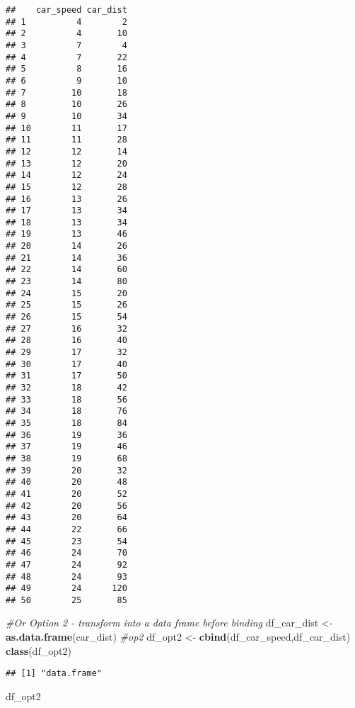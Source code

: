 \documentclass[
]{article}
\newenvironment{Shaded}{\begin{snugshade}}{\end{snugshade}}
\newcommand{\CommentTok}[1]{\textcolor[rgb]{0.56,0.35,0.01}{\textit{#1}}}
\newcommand{\FunctionTok}[1]{\textcolor[rgb]{0.13,0.29,0.53}{\textbf{#1}}}
\newcommand{\NormalTok}[1]{#1}
\newcommand{\OtherTok}[1]{\textcolor[rgb]{0.56,0.35,0.01}{#1}}
\begin{document}
\begin{verbatim}
##    car_speed car_dist
## 1          4        2
## 2          4       10
## 3          7        4
## 4          7       22
## 5          8       16
## 6          9       10
## 7         10       18
## 8         10       26
## 9         10       34
## 10        11       17
## 11        11       28
## 12        12       14
## 13        12       20
## 14        12       24
## 15        12       28
## 16        13       26
## 17        13       34
## 18        13       34
## 19        13       46
## 20        14       26
## 21        14       36
## 22        14       60
## 23        14       80
## 24        15       20
## 25        15       26
## 26        15       54
## 27        16       32
## 28        16       40
## 29        17       32
## 30        17       40
## 31        17       50
## 32        18       42
## 33        18       56
## 34        18       76
## 35        18       84
## 36        19       36
## 37        19       46
## 38        19       68
## 39        20       32
## 40        20       48
## 41        20       52
## 42        20       56
## 43        20       64
## 44        22       66
## 45        23       54
## 46        24       70
## 47        24       92
## 48        24       93
## 49        24      120
## 50        25       85
\end{verbatim}

\begin{Shaded}
\begin{Highlighting}[]
\CommentTok{\#Or Option 2 {-} transform into a data frame before binding}
\NormalTok{df\_car\_dist }\OtherTok{\textless{}{-}} \FunctionTok{as.data.frame}\NormalTok{(car\_dist)  }\CommentTok{\#op2}
\NormalTok{df\_opt2 }\OtherTok{\textless{}{-}} \FunctionTok{cbind}\NormalTok{(df\_car\_speed,df\_car\_dist)}
\FunctionTok{class}\NormalTok{(df\_opt2)}
\end{Highlighting}
\end{Shaded}

\begin{verbatim}
## [1] "data.frame"
\end{verbatim}

\begin{Shaded}
\begin{Highlighting}[]
\NormalTok{df\_opt2}
\end{Highlighting}
\end{Shaded}
\end{document}
